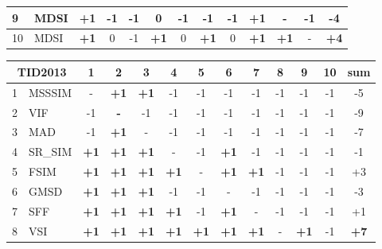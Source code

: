 \begin{table*}[htb]
{\begin{tabular}{|l|l|c|c|c|c|c|c|c|c|c|c||c|}
9         & MDSI           & \textbf{+1} & -1          & -1          & 0           & -1          & -1          & -1          & \textbf{+1} & -           & -1          & -4          \\ \hline
10        & MDSI          & \textbf{+1} & 0           & -1          & \textbf{+1} & 0 & \textbf{+1} & 0           & \textbf{+1} & \textbf{+1} & -           & \textbf{+4} \\ \hline
\end{tabular}
\hspace*{2 mm}
\begin{tabular}{|l|l|c|c|c|c|c|c|c|c|c|c||c|}
\hline
\multicolumn{2}{|c|}{TID2013} & 1           & 2           & 3           & 4           & 5           & 6           & 7           & 8           & 9           & 10 & sum         \\ \hline
1         & MSSSIM         & -           & \textbf{+1} & \textbf{+1} & -1          & -1          & -1          & -1          & -1          & -1          & -1 & -5          \\ \hline
2         & VIF            & -1          & \textbf{-}  & -1          & -1          & -1          & -1          & -1          & -1          & -1          & -1 & -9          \\ \hline
3         & MAD            & -1          & \textbf{+1} & -           & -1          & -1          & -1          & -1          & -1          & -1          & -1 & -7          \\ \hline
4         & SR\_SIM        & \textbf{+1} & \textbf{+1} & \textbf{+1} & -           & -1          & \textbf{+1} & -1          & -1          & -1          & -1 & -1          \\ \hline
5         & FSIM          & \textbf{+1} & \textbf{+1} & \textbf{+1} & \textbf{+1} & -           & \textbf{+1} & \textbf{+1} & -1          & -1          & -1 & +3          \\ \hline
6         & GMSD           & \textbf{+1} & \textbf{+1} & \textbf{+1} & -1          & -1          & -           & -1          & -1          & -1          & -1 & -3          \\ \hline
7         & SFF            & \textbf{+1} & \textbf{+1} & \textbf{+1} & \textbf{+1} & -1          & \textbf{+1} & -           & -1          & -1          & -1 & +1          \\ \hline
8         & VSI            & \textbf{+1} & \textbf{+1} & \textbf{+1} & \textbf{+1} & \textbf{+1} & \textbf{+1} & \textbf{+1} & -           & \textbf{+1} & -1 & \textbf{+7} \\ \hline

\end{tabular}}
\end{table*}
